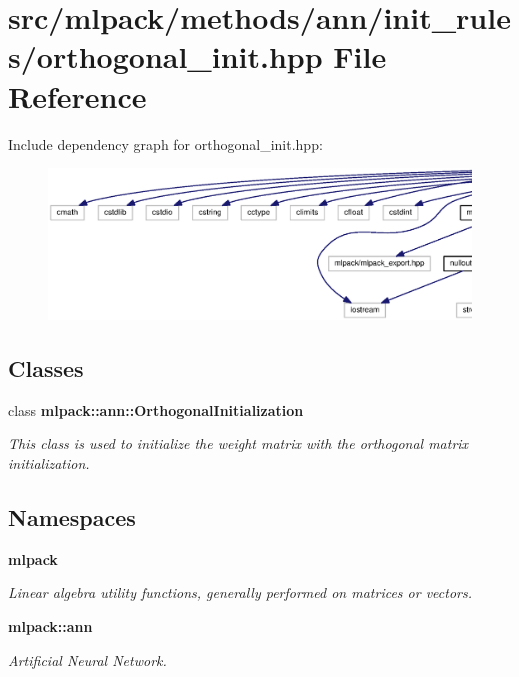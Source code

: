 \section{src/mlpack/methods/ann/init\+\_\+rules/orthogonal\+\_\+init.hpp File Reference}
\label{orthogonal__init_8hpp}
Include dependency graph for orthogonal\+\_\+init.\+hpp\+:
\nopagebreak
\begin{figure}[H]
\begin{center}
\leavevmode
\includegraphics[width=350pt]{orthogonal__init_8hpp__incl}
\end{center}
\end{figure}
\subsection*{Classes}
\begin{DoxyCompactItemize}
\item 
class {\bf mlpack\+::ann\+::\+Orthogonal\+Initialization}
\begin{DoxyCompactList}\small\item\em This class is used to initialize the weight matrix with the orthogonal matrix initialization. \end{DoxyCompactList}\end{DoxyCompactItemize}
\subsection*{Namespaces}
\begin{DoxyCompactItemize}
\item 
 {\bf mlpack}
\begin{DoxyCompactList}\small\item\em Linear algebra utility functions, generally performed on matrices or vectors. \end{DoxyCompactList}\item 
 {\bf mlpack\+::ann}
\begin{DoxyCompactList}\small\item\em Artificial Neural Network. \end{DoxyCompactList}\end{DoxyCompactItemize}


